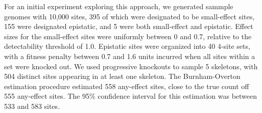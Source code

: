 For an initial experiment exploring this approach, we generated sammple genomes with 10,000 sites, 395 of which were designated to be small-effect sites, 155 were designated epistatic, and 5 were both small-effect and epistatic.
Effect sizes for the small-effect sites were uniformly between 0 and 0.7, relative to the detectability threshold of 1.0.
Epistatic sites were organized into 40 4-site sets, with a fitness penalty between 0.7 and 1.6 units incurred when all sites within a set were knocked out.
We used progressive knockouts to sample 5 skeletons, with 504 distinct sites appearing in at least one skeleton.
The Burnham-Overton estimation procedure estimated 558 any-effect sites, close to the true count off 555 any-effect sites.
The 95\% confidence interval for this estimation was between 533 and 583 sites.









